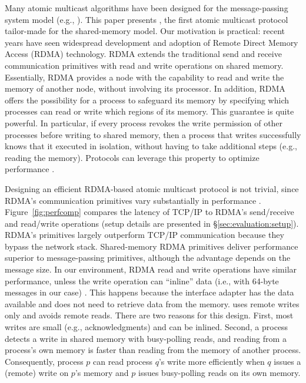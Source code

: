 Many atomic multicast algorithms have been designed for the message-passing system model (e.g., \cite{Coelho2017,gotsman2019white,birman1987reliable, delporte2000fault, bezerra2015ridge,
marandi2012multi}).
This paper presents \libname, the first atomic multicast protocol tailor-made for the shared-memory model.
Our motivation is practical: recent years have seen widespread development and adoption of Remote Direct Memory Access (RDMA) technology.
RDMA extends the traditional send and receive communication primitives with read and write operations on shared memory.
Essentially, RDMA provides a node with the capability to read and write the memory of another node, without involving its processor.
In addition, RDMA offers the possibility for a process to safeguard its memory by specifying which processes can read or write which regions of its memory.
This guarantee is quite powerful.
In particular, if every process revokes the write permission of other processes before writing to shared memory, then a process that writes successfully knows that it executed in isolation, without having to take additional steps (e.g., reading the memory). 
Protocols can leverage this property to optimize performance \cite{Aguilera2019}.

Designing an efficient RDMA-based atomic multicast protocol is not trivial, since RDMA's communication primitives vary substantially in performance \cite{Kalia2014,mitchell2013using}.
Figure~\ref{fig:perfcomp} compares the latency of TCP/IP to RDMA's send/receive and read/write operations (setup details are presented in \S\ref{sec:evaluation:setup}).
RDMA's primitives largely outperform TCP/IP communication because they bypass the network stack.
Shared-memory RDMA primitives deliver performance superior to message-passing primitives, although the advantage depends on the message size.
In our environment, RDMA read and write operations have similar performance, unless the write operation can ``inline'' data (i.e., with 64-byte messages in our case) \cite{mitchell2013using}.
This happens because the interface adapter has the data available and does not need to retrieve data from the memory.
\libname uses remote writes only and avoids remote reads.
There are two reasons for this design.
First, most writes are small (e.g., acknowledgments) and can be inlined.
Second, a process detects a write in shared memory with busy-polling reads, and reading from a process's own memory is faster than reading from the memory of another process.
Consequently, process $p$ can read process $q$'s write more efficiently when $q$ issues a (remote) write on $p$'s memory and $p$ issues busy-polling reads on its own memory.  

